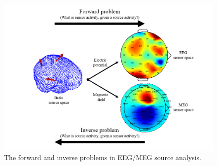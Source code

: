 \begin{figure}[!b]
\centering
\includegraphics[width=1\textwidth]{images/ForwardInverse.png} %
\caption{The forward and inverse problems in EEG/MEG source analysis.}
\label{fig:ForwardInverse}
\end{figure}